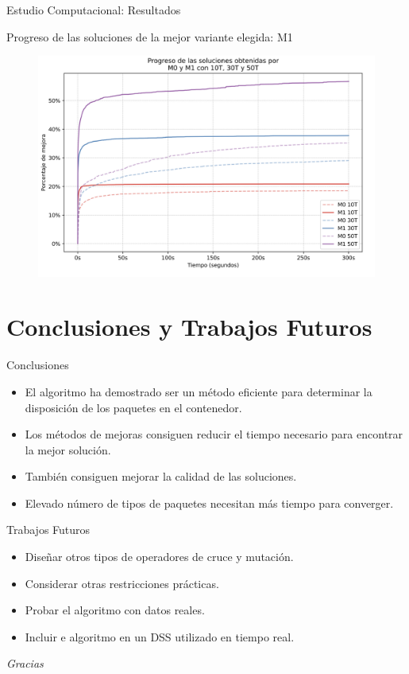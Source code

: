 \documentclass[handout]{beamer}
\begin{document}
\begin{frame}{Estudio Computacional: Resultados}
    \begin{exampleblock}{Progreso de las soluciones de la mejor variante elegida: M1}
        \begin{figure}
            \centering
            \includegraphics[width=0.8\linewidth]{pic/exp-progreso-soluciones.png}
        \end{figure}
    \end{exampleblock}
\end{frame}

\section[Conclusiones]{Conclusiones y Trabajos Futuros}

\begin{frame}{Conclusiones}
    \begin{itemize}[<+-| alert@+>]
        \item El algoritmo ha demostrado ser un método eficiente para determinar la disposición de los paquetes en el contenedor.
        \item Los métodos de mejoras consiguen reducir el tiempo necesario para encontrar la mejor solución.
        \item También consiguen mejorar la calidad de las soluciones.
        \item Elevado número de tipos de paquetes necesitan más tiempo para converger.
    \end{itemize}
\end{frame}

\begin{frame}{Trabajos Futuros}
    \begin{itemize}[<+-| alert@+>]
        \item Diseñar otros tipos de operadores de cruce y mutación.
        \item Considerar otras restricciones prácticas.
        \item Probar el algoritmo con datos reales.
        \item Incluir e  algoritmo en un DSS utilizado en tiempo real.
    \end{itemize}
\end{frame}

\begin{frame}
    \begin{center}
        {\Huge \textit{\selectfont Gracias}}
    \end{center}
\end{frame}
\end{document}
